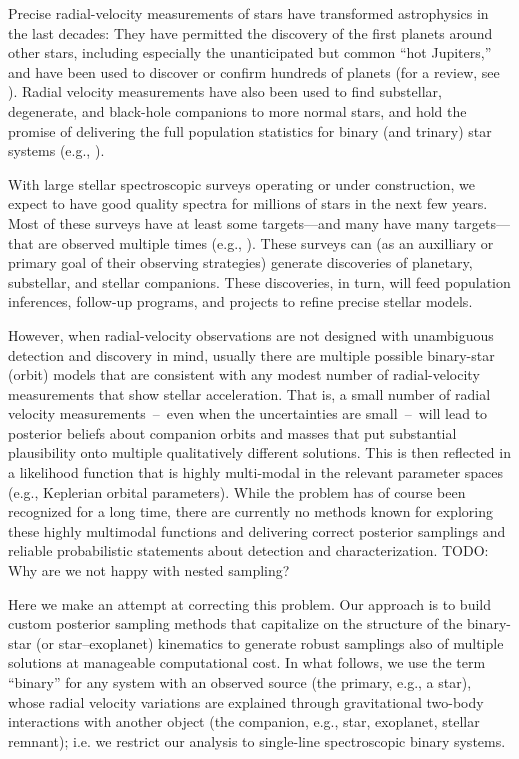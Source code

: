 \documentclass[manuscript, letterpaper]{aastex6}
\newcommand{\todo}[1]{{\color{red}TODO: #1}}
\begin{document}
Precise radial-velocity measurements of stars have transformed
astrophysics in the last decades:
They have permitted the discovery of the first planets around other stars,
including especially the unanticipated but common ``hot Jupiters,''
and have been used to discover or confirm hundreds
of planets (for a review, see \citealt{Udry:2007}).
Radial velocity measurements have also been used to find substellar,
degenerate, and black-hole companions to more normal stars, and hold
the promise of delivering the full population statistics for binary
(and trinary) star systems (e.g., \citealt{Raghavan:2010,
Tokovinin:2014,Troup:2016}).

With large stellar spectroscopic surveys operating or under
construction, we expect to have good quality spectra for millions
of stars in the next few years.
Most of these surveys have at least some targets---and many have many
targets---that are observed multiple times (e.g., \citealt{Majewski:2015}).
These surveys can (as an auxilliary or primary goal of their observing
strategies) generate discoveries of planetary, substellar, and stellar
companions.
These discoveries, in turn, will feed population inferences, follow-up
programs, and projects to refine precise stellar models.

However, when radial-velocity observations are not designed with
unambiguous detection and discovery in mind, usually there are
multiple possible binary-star (orbit) models that are consistent with any
modest number of radial-velocity measurements that show stellar
acceleration.
That is, a small number of radial velocity measurements~--~even when the
uncertainties are small~--~will lead to posterior beliefs about companion
orbits and masses that put substantial plausibility onto multiple
qualitatively different solutions.
This is then reflected in a likelihood function that is highly multi-modal in
the relevant parameter spaces (e.g., Keplerian orbital parameters).
While the problem has of course been recognized for a long time, there are
currently no methods known for exploring these highly multimodal functions and
delivering correct posterior samplings and reliable probabilistic statements
about detection and characterization.
\todo{Why are we not happy with nested sampling?}

Here we make an attempt at correcting this problem.
Our approach is to build custom posterior sampling methods that capitalize on
the structure of the binary-star (or star--exoplanet) kinematics to generate
robust samplings also of multiple solutions at manageable computational cost.
In what follows, we use the term ``binary'' for any system with an observed
source (the primary, e.g., a star), whose radial velocity variations are
explained through gravitational two-body interactions with another object (the
companion, e.g., star, exoplanet, stellar remnant); i.e. we restrict our
analysis to single-line spectroscopic binary systems.
\end{document}
